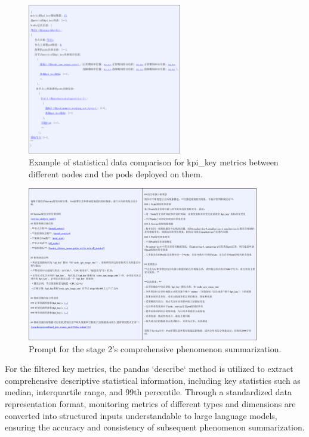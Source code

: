\documentclass[10pt]{article}
\begin{document}
\begin{figure}[!t]
    \centering
    \includegraphics[width=0.6\textwidth]{fig15.png}
    \caption{Example of statistical data comparison for kpi\_key metrics between different nodes and the pods deployed on them.}
    \label{fig15}
\end{figure}

\begin{figure}[!t]
    \centering
    \includegraphics[width=0.9\textwidth]{fig16.png}
    \caption{Prompt for the stage 2's comprehensive phenomenon summarization.}
    \label{fig16}
\end{figure}

For the filtered key metrics, the pandas `describe` method is utilized to extract comprehensive descriptive statistical information, including key statistics such as median, interquartile range, and 99th percentile. Through a standardized data representation format, monitoring metrics of different types and dimensions are converted into structured inputs understandable to large language models, ensuring the accuracy and consistency of subsequent phenomenon summarization.
\end{document}
